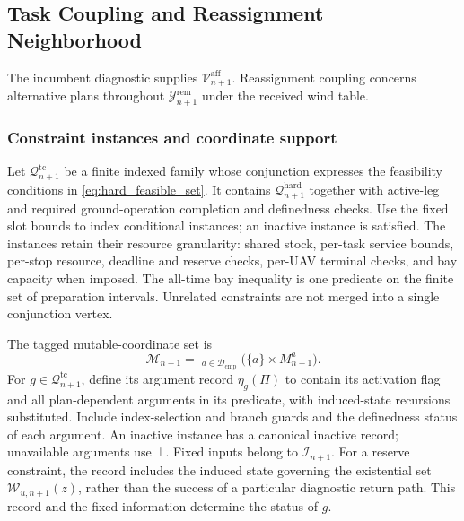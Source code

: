 \subsection{Task Coupling and Reassignment Neighborhood}
\label{subsec:reassignment_coupling}

The incumbent diagnostic supplies $\mathcal V_{n+1}^{\mathrm{aff}}$.
Reassignment coupling concerns alternative plans throughout
$\mathcal Y_{n+1}^{\mathrm{rem}}$ under the received wind table.

\subsubsection{Constraint instances and coordinate support}
Let $\mathcal Q_{n+1}^{\mathrm{tc}}$ be a finite indexed family whose
conjunction expresses the feasibility conditions in
\eqref{eq:hard_feasible_set}. It contains
$\mathcal Q_{n+1}^{\mathrm{hard}}$ together with active-leg and required
ground-operation completion and definedness checks. Use the fixed slot
bounds to index conditional instances; an inactive instance is satisfied.
The instances retain their resource granularity: shared stock, per-task
service bounds, per-stop resource, deadline and reserve checks, per-UAV
terminal checks, and bay capacity when imposed. The all-time bay inequality
is one predicate on the finite set of preparation intervals. Unrelated
constraints are not merged into a single conjunction vertex.

The tagged mutable-coordinate set is
\begin{equation}
\mathcal M_{n+1}
=\mathop{\dot\bigcup}_{a\in\mathcal D_{\mathrm{cmp}}}
\bigl(\{a\}\times M_{n+1}^a\bigr).
\label{eq:tagged_mutable_coordinates}
\end{equation}
For $g\in\mathcal Q_{n+1}^{\mathrm{tc}}$, define its argument record
$\eta_g(\Pi)$ to contain its activation flag and all plan-dependent
arguments in its predicate, with induced-state recursions substituted.
Include index-selection and branch guards and the definedness status of
each argument. An inactive instance has a canonical inactive record;
unavailable arguments use $\bot$. Fixed inputs belong to
$\mathscr I_{n+1}$. For a reserve constraint, the record includes the
induced state governing the existential set $\mathscr W_{u,n+1}(z)$,
rather than the success of a particular diagnostic return path.
This record and the fixed information determine the status of $g$.

